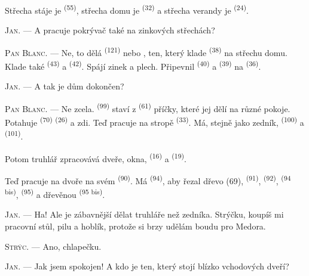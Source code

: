 Střecha stáje je  \textsuperscript{(55)}, střecha domu je
 \textsuperscript{(32)} a střecha verandy je 
\textsuperscript{(24)}.

\textsc{Jan}. --- A pracuje pokrývač také na zinkových střechách?

\textsc{Pan Blanc}. --- Ne, to dělá  \textsuperscript{(121)} nebo
, ten, který klade  \textsuperscript{(38)} na střechu
domu. Klade také  \textsuperscript{(43)} a 
\textsuperscript{(42)}. Spájí zinek a plech. Připevnil 
\textsuperscript{(40)} a  \textsuperscript{(39)} na
 \textsuperscript{(36)}.

\textsc{Jan}. --- A tak je dům dokončen?

\VUsaut{3.0mm}
\VUsaut{3.0mm}

\textsc{Pan Blanc}. --- Ne zcela.  \textsuperscript{(99)} staví z
 \textsuperscript{(61)} příčky, které jej dělí na různé pokoje. Potahuje
 \textsuperscript{(70)}  \textsuperscript{(26)} a zdi.
Teď pracuje na stropě  \textsuperscript{(33)}. Má, stejně jako zedník,
 \textsuperscript{(100)} a 
\textsuperscript{(101)}.

Potom truhlář zpracovává dveře, okna,  \textsuperscript{(16)} a
 \textsuperscript{(19)}.

Teď pracuje na dvoře na svém  \textsuperscript{(90)}. Má
 \textsuperscript{(94)}, aby řezal dřevo (69), 
\textsuperscript{(91)},  \textsuperscript{(92)}, 
\textsuperscript{(94 bis)},  \textsuperscript{(95)} a dřevěnou
 \textsuperscript{(95 bis)}.

\textsc{Jan}. --- Ha! Ale je zábavnější dělat truhláře než zedníka. Strýčku, koupíš mi
pracovní stůl, pilu a hoblík, protože si brzy udělám boudu pro Medora.

\textsc{Strýc}. --- Ano, chlapečku.

\textsc{Jan}. --- Jak jsem spokojen! A kdo je ten, který stojí blízko vchodových dveří?

